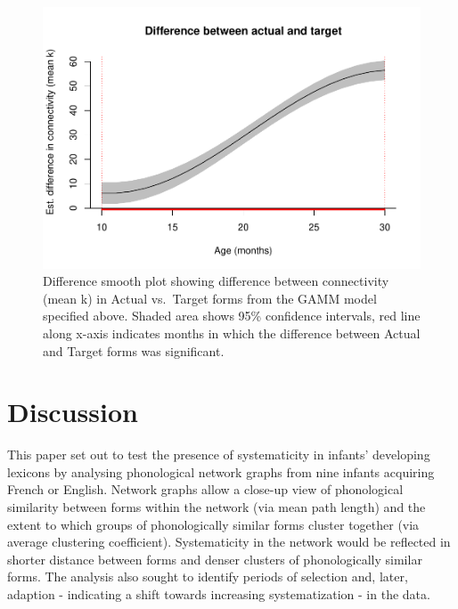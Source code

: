 \documentclass[
  man]{apa6}
\begin{document}
\begin{figure}
\centering
\includegraphics{NetworkGraphs_R2_files/figure-latex/difference-plot-mean-k-1.pdf}
\caption{\label{fig:difference-plot-mean-k}Difference smooth plot showing difference between connectivity (mean k) in Actual vs.~Target forms from the GAMM model specified above. Shaded area shows 95\% confidence intervals, red line along x-axis indicates months in which
the difference between Actual and Target forms was significant.}
\end{figure}

\section{Discussion}\label{discussion}

This paper set out to test the presence of systematicity in infants' developing lexicons by analysing phonological network graphs from nine infants acquiring French or English. Network graphs allow a close-up view of phonological similarity between forms within the network (via mean path length) and the extent to which groups of phonologically similar forms cluster together (via average clustering coefficient). Systematicity in the network would be reflected in shorter distance between forms and denser clusters of phonologically similar forms. The analysis also sought to identify periods of selection and, later, adaption - indicating a shift towards increasing systematization - in the data.
\end{document}
